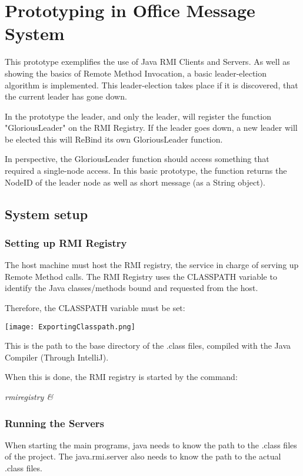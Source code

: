 \chapter{Prototyping in Office Message System}
This prototype exemplifies the use of Java RMI Clients and Servers. As well as showing the basics of Remote Method Invocation, a basic leader-election algorithm is implemented. This leader-election takes place if it is discovered, that the current leader has gone down.

In the prototype the leader, and only the leader, will register the function "GloriousLeader" on the RMI Registry. 
If the leader goes down, a new leader will be elected this will ReBind its own GloriousLeader function.

In perspective, the GloriousLeader function should access something that required a single-node access. In this basic prototype, the function returns the NodeID of the leader node as well as short message (as a String object).

\section{System setup}
\subsection{Setting up RMI Registry}
The host machine must host the RMI registry, the service in charge of serving up Remote Method calls.
The RMI Registry uses the CLASSPATH variable to identify the Java classes/methods bound and requested from the host. 

Therefore, the CLASSPATH variable must be set:

\begin{center}
	\texttt{[image: ExportingClasspath.png]}
\end{center}

This is the path to the base directory of the .class files, compiled with the Java Compiler (Through IntelliJ).

When this is done, the RMI registry is started by the command:

\textit{rmiregistry \&}

\subsection{Running the Servers}
When starting the main programs, java needs to know the path to the .class files of the project. The java.rmi.server also needs to know the path to the actual .class files.

